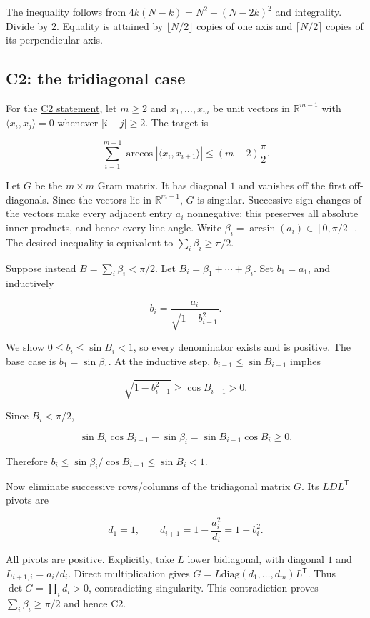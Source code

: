 \documentclass[11pt,a4paper]{article}
\begin{document}
The inequality follows from \(4k(N-k)=N^2-(N-2k)^2\) and integrality. Divide by \(2\). Equality is attained by \(\lfloor N/2\rfloor\) copies of one axis and \(\lceil N/2\rceil\) copies of its perpendicular axis.

\subsection{C2: the tridiagonal case}\label{c2-the-tridiagonal-case}

For the \href{https://hackathon.bainsa.ai/p/p1/c2}{C2 statement}, let \(m\ge2\) and \(x_1,\ldots,x_m\) be unit vectors in \(\mathbb R^{m-1}\) with \(\langle x_i,x_j\rangle=0\) whenever \(|i-j|\ge2\). The target is

\[
\sum_{i=1}^{m-1}\arccos|\langle x_i,x_{i+1}\rangle|\le(m-2)\frac{\pi}{2}.
\]

Let \(G\) be the \(m\times m\) Gram matrix. It has diagonal \(1\) and vanishes off the first off-diagonals. Since the vectors lie in \(\mathbb R^{m-1}\), \(G\) is singular. Successive sign changes of the vectors make every adjacent entry \(a_i\) nonnegative; this preserves all absolute inner products, and hence every line angle. Write \(\beta_i=\arcsin(a_i)\in[0,\pi/2]\). The desired inequality is equivalent to \(\sum_i\beta_i\ge\pi/2\).

Suppose instead \(B=\sum_i\beta_i<\pi/2\). Let \(B_i=\beta_1+\cdots+\beta_i\). Set \(b_1=a_1\), and inductively

\[
b_i=\frac{a_i}{\sqrt{1-b_{i-1}^2}}.
\]

We show \(0\le b_i\le\sin B_i<1\), so every denominator exists and is positive. The base case is \(b_1=\sin\beta_1\). At the inductive step, \(b_{i-1}\le\sin B_{i-1}\) implies

\[
\sqrt{1-b_{i-1}^2}\ge\cos B_{i-1}>0.
\]

Since \(B_i<\pi/2\),

\[
\sin B_i\cos B_{i-1}-\sin\beta_i
=\sin B_{i-1}\cos B_i\ge0.
\]

Therefore \(b_i\le\sin\beta_i/\cos B_{i-1}\le\sin B_i<1\).

Now eliminate successive rows/columns of the tridiagonal matrix \(G\). Its \(LDL^{\mathsf T}\) pivots are

\[
d_1=1,\qquad d_{i+1}=1-\frac{a_i^2}{d_i}=1-b_i^2.
\]

All pivots are positive. Explicitly, take \(L\) lower bidiagonal, with diagonal \(1\) and \(L_{i+1,i}=a_i/d_i\). Direct multiplication gives \(G=L\mathrm{diag}(d_1,\ldots,d_m)L^{\mathsf T}\). Thus \(\det G=\prod_i d_i>0\), contradicting singularity. This contradiction proves \(\sum_i\beta_i\ge\pi/2\) and hence C2.
\end{document}
